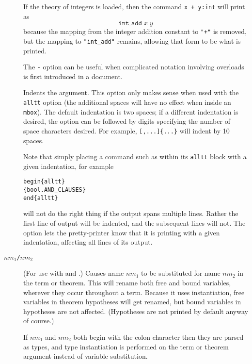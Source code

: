 \begin{description}
If the theory of integers is loaded, then the command \texttt{\holtm[-+]\lb{}x + y:int\rb} will print as \[
\texttt{int\_add}\;x\;y
\]
because the mapping from the integer addition constant to \texttt{"+"} is removed, but the mapping to \texttt{"int\_add"} remains, allowing that form to be what is printed.

The \texttt{-} option can be useful when complicated notation involving overloads is first introduced in a document.

\item[\texttt{\indentoption}] Indents the argument.
%
  This option only makes sense when used with the \texttt{alltt} option (the additional spaces will have no effect when inside an \texttt{\bs{}mbox}).
%
  The default indentation is two spaces; if a different indentation is desired, the option can be followed by digits specifying the number of space characters desired.
%
  For example, \texttt{\holthm{}[,...]\{...\}} will indent by 10 spaces.

  Note that simply placing a command such as \holthm{} within its \texttt{alltt} block with a given indentation, for example
\begin{alltt}
   \bs{}begin\{alltt\}
      \holthm\{bool.AND_CLAUSES\}
   \bs{}end\{alltt\}
\end{alltt}
will not do the right thing if the output spans multiple lines.
%
Rather the first line of \HOL{} output will be indented, and the subsequent lines will not.
%
The \texttt{\indentoption} option lets the pretty-printer know that it is printing with a given indentation, affecting all lines of its output.


\item[$\mathit{nm}_1$\texttt{/}$\mathit{nm}_2$] (For use with \holtm{}
  and \holthm{}.)
%
Causes name $\mathit{nm}_1$ to be substituted for name $\mathit{nm}_2$ in the term or theorem.
%
This will rename both free and bound variables, wherever they occur throughout a term.
%
Because it uses instantiation, free variables in theorem hypotheses will get renamed, but bound variables in hypotheses are not affected.
%
(Hypotheses are not printed by default anyway of course.)

If $\mathit{nm}_1$ and $\mathit{nm}_2$ both begin with the colon character then they are parsed as types, and type instantiation is performed on the term or theorem argument instead of variable substitution.
\end{description}


